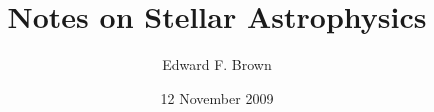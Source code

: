 \documentclass[11pt]{book}
\begin{document}
\title{Notes on Stellar Astrophysics}
\author{ Edward F. Brown}
\date{12 November 2009}
\maketitle

\tableofcontents













\appendix


\end{document}
